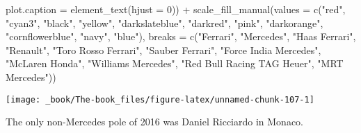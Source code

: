 \documentclass[
]{book}
\newenvironment{Shaded}{\begin{snugshade}}{\end{snugshade}}
\newcommand{\AttributeTok}[1]{\textcolor[rgb]{0.77,0.63,0.00}{#1}}
\newcommand{\DecValTok}[1]{\textcolor[rgb]{0.00,0.00,0.81}{#1}}
\newcommand{\FunctionTok}[1]{\textcolor[rgb]{0.00,0.00,0.00}{#1}}
\newcommand{\NormalTok}[1]{#1}
\newcommand{\SpecialCharTok}[1]{\textcolor[rgb]{0.00,0.00,0.00}{#1}}
\newcommand{\StringTok}[1]{\textcolor[rgb]{0.31,0.60,0.02}{#1}}
\begin{document}
\begin{Shaded}
\begin{Highlighting}[]
        \AttributeTok{plot.caption =} \FunctionTok{element\_text}\NormalTok{(}\AttributeTok{hjust =} \DecValTok{0}\NormalTok{)) }\SpecialCharTok{+}
  \FunctionTok{scale\_fill\_manual}\NormalTok{(}\AttributeTok{values =} \FunctionTok{c}\NormalTok{(}\StringTok{"red"}\NormalTok{, }
                                \StringTok{"cyan3"}\NormalTok{,  }
                                \StringTok{"black"}\NormalTok{, }
                                \StringTok{"yellow"}\NormalTok{,}
                               \StringTok{"darkslateblue"}\NormalTok{, }
                                \StringTok{"darkred"}\NormalTok{,  }
                                \StringTok{"pink"}\NormalTok{, }
                                \StringTok{"darkorange"}\NormalTok{, }
                                \StringTok{"cornflowerblue"}\NormalTok{,}
                               \StringTok{"navy"}\NormalTok{,}
                               \StringTok{"blue"}\NormalTok{),}
                     \AttributeTok{breaks =} \FunctionTok{c}\NormalTok{(}\StringTok{"Ferrari"}\NormalTok{,}
                                 \StringTok{"Mercedes"}\NormalTok{,}
                                 \StringTok{"Haas Ferrari"}\NormalTok{,}
                                 \StringTok{"Renault"}\NormalTok{,}
                                 \StringTok{"Toro Rosso Ferrari"}\NormalTok{,}
                                 \StringTok{"Sauber Ferrari"}\NormalTok{, }
                                 \StringTok{"Force India Mercedes"}\NormalTok{,}
                                 \StringTok{"McLaren Honda"}\NormalTok{,}
                                 \StringTok{"Williams Mercedes"}\NormalTok{,}
                                 \StringTok{"Red Bull Racing TAG Heuer"}\NormalTok{,}
                                \StringTok{"MRT Mercedes"}\NormalTok{))}
\end{Highlighting}
\end{Shaded}

\begin{center}\texttt{[image: \_book/The-book\_files/figure-latex/unnamed-chunk-107-1]} \end{center}

The only non-Mercedes pole of 2016 was Daniel Ricciardo in Monaco.
\end{document}
